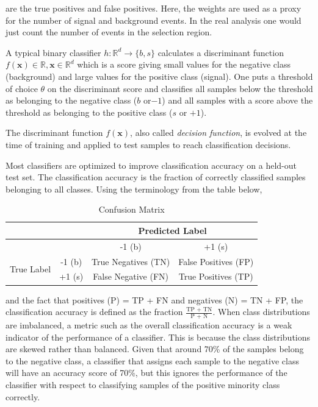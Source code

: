 are the true positives and false positives. Here, the weights are used as a proxy for the number of signal and background events. In the real analysis one would just count the number of events in the selection region.  

A typical binary classifier $h: \mathbb{R}^{d} \rightarrow \{b,s\}$ calculates a discriminant function $f(\mathbf{x}) \in \mathbb{R},\mathbf{x} \in \mathbb{R}^{d}$ which is a score giving small values for the negative class (background) and large values for the positive class (signal). One puts a threshold of choice $\theta$ on the discriminant score and classifies all samples below the threshold as belonging to the negative class ($b$ or$-1$) and all samples with a score above the threshold as belonging to the positive class ($s$ or $+1$). 

The discriminant function $f(\mathbf{x})$, also called \textit{decision function}, is evolved at the time of training and applied to test samples to reach classification decisions.

Most classifiers are optimized to improve classification accuracy on a held-out test set. The classification accuracy is the fraction of correctly classified samples belonging to all classes. Using the terminology from the table below, 

\begin{table}[h]
\begin{center}
\begin{tabular}{c|c|c|c}
 & & \multicolumn{2}{c}{Predicted Label}\\
 \hline
 & & -1 (b) & +1 (s) \\
 \hline
\multirow{3}{*}{True Label} & -1 (b) & True Negatives (TN) & False Positives (FP)  \\ 
& +1 (s) & False Negative (FN) & True Positives (TP) \\
\end{tabular}
\label{cf}
\caption{Confusion Matrix}
\end{center}
\end{table}

and the fact that positives (P) = TP + FN and negatives (N) = TN + FP, the classification accuracy is defined as the fraction $\frac{\displaystyle \text{TP + TN}}{\displaystyle \text{P + N}}$. When class distributions are imbalanced, a metric such as the overall classification accuracy is a weak indicator of the performance of a classifier. This is because the class distributions are skewed rather than balanced. Given that around 70\% of the samples belong to the negative class, a classifier that assigns each sample to the negative class will have an accuracy score of 70\%, but this ignores the performance of the classifier with respect to classifying samples of the positive minority class correctly. 

